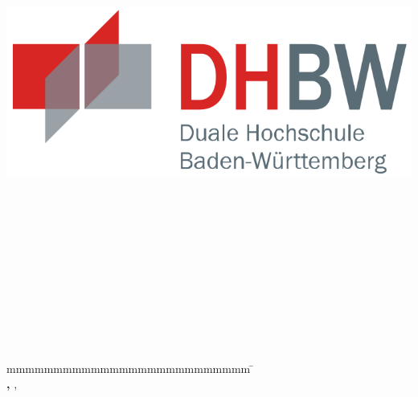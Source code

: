 
\begin{titlepage}
	\begin{center}
	    \includegraphics[height=0.1\textwidth]{data/images/dhbw.png}	    
	\end{center}

	\enlargethispage{20mm}
	\begin{center}
		\vspace*{12mm}	{\LARGE\textbf \titel }\\
		\vspace*{6mm}	{\large\textbf \untertitel }\\
		\vspace*{12mm}	{\large\textbf \arbeit}\\
		\vspace*{12mm}	\langdeckblattabschlusshinleitung\\
		\vspace*{3mm}		{\textbf \abschluss}\\
		\vspace*{12mm}	\langartikelstudiengang{} \langstudiengang{} \studiengang\\
		\vspace*{3mm}		\langanderdh{} \dhbw\\
		\vspace*{12mm}	\langvon\\
		\vspace*{3mm}		{\large\textbf \autor}\\
		\vspace*{12mm}	\datumAbgabe\\
		\vspace*{12mm}
	\end{center}
	\vfill
	\begin{spacing}{1.2}
		\begin{tabbing}
			mmmmmmmmmmmmmmmmmmmmmmmmmm             \= \kill
			\textbf{\langdbbearbeitungszeit}       \>  \zeitraum\\
			\textbf{\langdbmatriknr, \langdbkurs}  \>  \martrikelnr, \kurs\\
			\textbf{\langdbbetreuer}               \>  \betreuer\\
		\end{tabbing}
	\end{spacing}
\end{titlepage}
